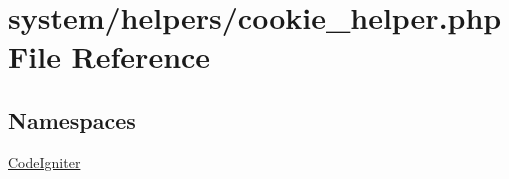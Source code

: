 \hypertarget{cookie__helper_8php}{\section{system/helpers/cookie\-\_\-helper.php File Reference}
\label{cookie__helper_8php}
}
\subsection*{Namespaces}
\begin{DoxyCompactItemize}
\item 
\hyperlink{namespace_code_igniter}{Code\-Igniter}
\end{DoxyCompactItemize}
